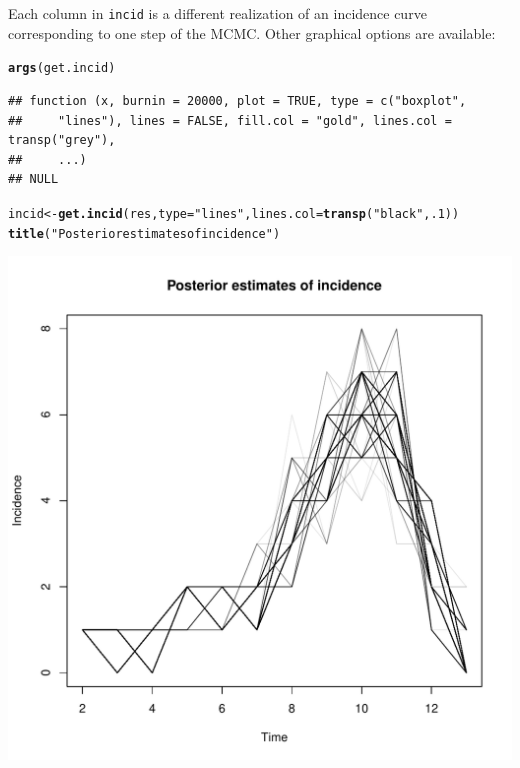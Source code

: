 \documentclass{article}\usepackage[]{graphicx}\usepackage[]{color}
\makeatletter
\newcommand{\hlnum}[1]{\textcolor[rgb]{0.686,0.059,0.569}{#1}}%
\newcommand{\hlstr}[1]{\textcolor[rgb]{0.192,0.494,0.8}{#1}}%
\newcommand{\hlstd}[1]{\textcolor[rgb]{0.345,0.345,0.345}{#1}}%
\newcommand{\hlkwb}[1]{\textcolor[rgb]{0.69,0.353,0.396}{#1}}%
\newcommand{\hlkwc}[1]{\textcolor[rgb]{0.333,0.667,0.333}{#1}}%
\newcommand{\hlkwd}[1]{\textcolor[rgb]{0.737,0.353,0.396}{\textbf{#1}}}%
\newenvironment{kframe}{%
 \def\at@end@of@kframe{}%
 \ifinner\ifhmode%
  \def\at@end@of@kframe{\end{minipage}}%
  \begin{minipage}{\columnwidth}%
 \fi\fi%
 \def\FrameCommand##1{\hskip\@totalleftmargin \hskip-\fboxsep
 \colorbox{shadecolor}{##1}\hskip-\fboxsep
     \hskip-\linewidth \hskip-\@totalleftmargin \hskip\columnwidth}%
 \MakeFramed {\advance\hsize-\width
   \@totalleftmargin\z@ \linewidth\hsize
   \@setminipage}}%
 {\par\unskip\endMakeFramed%
 \at@end@of@kframe}
\newenvironment{knitrout}{}{} %
\makeatother
\begin{document}
Each column in \texttt{incid} is a different realization of an incidence curve corresponding to one
step of the MCMC.
Other graphical options are available:
\begin{knitrout}
\color{fgcolor}\begin{kframe}
\begin{alltt}
\hlkwd{args}\hlstd{(get.incid)}
\end{alltt}
\begin{verbatim}
## function (x, burnin = 20000, plot = TRUE, type = c("boxplot", 
##     "lines"), lines = FALSE, fill.col = "gold", lines.col = transp("grey"), 
##     ...) 
## NULL
\end{verbatim}
\begin{alltt}
\hlstd{incid} \hlkwb{<-} \hlkwd{get.incid}\hlstd{(res,} \hlkwc{type}\hlstd{=}\hlstr{"lines"}\hlstd{,}\hlkwc{lines.col}\hlstd{=}\hlkwd{transp}\hlstd{(}\hlstr{"black"}\hlstd{,}\hlnum{.1}\hlstd{))}
\hlkwd{title}\hlstd{(}\hlstr{"Posterior estimates of incidence"}\hlstd{)}
\end{alltt}
\end{kframe}

{\centering \includegraphics[width=.6\textwidth]{figs/unnamed-chunk-46} 

}



\end{knitrout}
\end{document}

